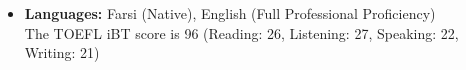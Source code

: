 \documentclass[12pt]{article}
\begin{document}
\begin{itemize}
	
	\item \textbf{Languages:} Farsi (Native), English (Full Professional Proficiency) %
	\vspace{1pt} \\
	The TOEFL iBT score is 96 (Reading: 26, Listening: 27, Speaking: 22, Writing: 21)
\end{itemize}
\end{document}
